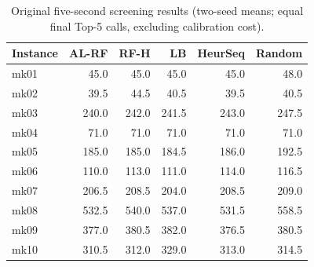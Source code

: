 \begin{table}[htbp]\centering\small
\caption{Original five-second screening results (two-seed means; equal final Top-5 calls, excluding calibration cost).}\label{tab:active}
\begin{tabular}{lrrrrr}\toprule
Instance & AL-RF & RF-H & LB & HeurSeq & Random \\ \midrule
mk01 & 45.0 & 45.0 & 45.0 & 45.0 & 48.0 \\
mk02 & 39.5 & 44.5 & 40.5 & 39.5 & 40.5 \\
mk03 & 240.0 & 242.0 & 241.5 & 243.0 & 247.5 \\
mk04 & 71.0 & 71.0 & 71.0 & 71.0 & 71.0 \\
mk05 & 185.0 & 185.0 & 184.5 & 186.0 & 192.5 \\
mk06 & 110.0 & 113.0 & 111.0 & 114.0 & 116.5 \\
mk07 & 206.5 & 208.5 & 204.0 & 208.5 & 209.0 \\
mk08 & 532.5 & 540.0 & 537.0 & 531.5 & 558.5 \\
mk09 & 377.0 & 380.5 & 382.0 & 376.5 & 380.5 \\
mk10 & 310.5 & 312.0 & 329.0 & 313.0 & 314.5 \\
\bottomrule
\end{tabular}\end{table}
